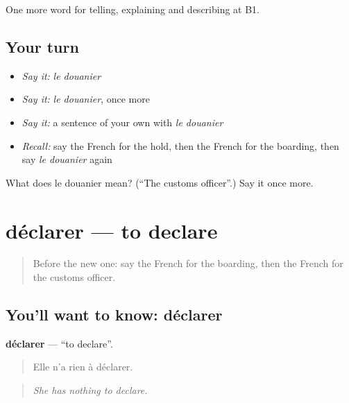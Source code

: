 \begin{grammarlens}[title={What you've built}]
One more word for telling, explaining and describing at B1.
\end{grammarlens}

\subsection*{Your turn}
\begin{itemize}
\raggedright
  \item \emph{Say it:} \emph{le douanier}
  \item \emph{Say it:} \emph{le douanier}, once more
  \item \emph{Say it:} a sentence of your own with \emph{le douanier}
  \item \emph{Recall:} say the French for the hold, then the French for the boarding, then say \emph{le douanier} again
\end{itemize}

\begin{tcolorbox}[breakable,colback=teal!4,colframe=teal!35!black,title={Before you move on}]
What does le douanier mean? (\textquotedblleft{}The customs officer\textquotedblright{}.) Say it once more.
\end{tcolorbox}
\section[déclarer]{déclarer — to declare}

\label{lesson:FR-C417-declarer}



\begin{quote}
Before the new one: say the French for the boarding, then the French for the customs officer.
\end{quote}

\subsection*{You'll want to know: déclarer}
\textbf{déclarer} — \textquotedblleft{}to declare\textquotedblright{}.

\begin{quote}
Elle n'a rien à déclarer.
\end{quote}

\begin{quote}
\emph{She has nothing to declare.}
\end{quote}

